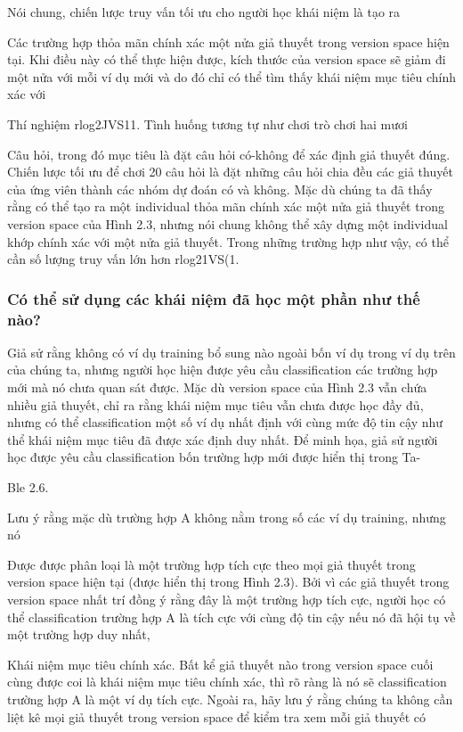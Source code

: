 Nói chung, chiến lược truy vấn tối ưu cho người học khái niệm là tạo ra

Các trường hợp thỏa mãn chính xác một nửa giả thuyết trong version space hiện tại. Khi điều này có thể thực hiện được, kích thước của version space sẽ giảm đi một nửa với mỗi ví dụ mới và do đó chỉ có thể tìm thấy khái niệm mục tiêu chính xác với

Thí nghiệm rlog2JVS11. Tình huống tương tự như chơi trò chơi hai mươi

Câu hỏi, trong đó mục tiêu là đặt câu hỏi có-không để xác định giả thuyết đúng. Chiến lược tối ưu để chơi 20 câu hỏi là đặt những câu hỏi chia đều các giả thuyết của ứng viên thành các nhóm dự đoán có và không. Mặc dù chúng ta đã thấy rằng có thể tạo ra một individual thỏa mãn chính xác một nửa giả thuyết trong version space của Hình 2.3, nhưng nói chung không thể xây dựng một individual khớp chính xác với một nửa giả thuyết. Trong những trường hợp như vậy, có thể cần số lượng truy vấn lớn hơn rlog21VS(1.

\subsubsection{Có thể sử dụng các khái niệm đã học một phần như thế nào?}

Giả sử rằng không có ví dụ training bổ sung nào ngoài bốn ví dụ trong ví dụ trên của chúng ta, nhưng người học hiện được yêu cầu classification các trường hợp mới mà nó chưa quan sát được. Mặc dù version space của Hình 2.3 vẫn chứa nhiều giả thuyết, chỉ ra rằng khái niệm mục tiêu vẫn chưa được học đầy đủ, nhưng có thể classification một số ví dụ nhất định với cùng mức độ tin cậy như thể khái niệm mục tiêu đã được xác định duy nhất. Để minh họa, giả sử người học được yêu cầu classification bốn trường hợp mới được hiển thị trong Ta-

Ble 2.6.

Lưu ý rằng mặc dù trường hợp A không nằm trong số các ví dụ training, nhưng nó

Được được phân loại là một trường hợp tích cực theo mọi giả thuyết trong version space hiện tại (được hiển thị trong Hình 2.3). Bởi vì các giả thuyết trong version space nhất trí đồng ý rằng đây là một trường hợp tích cực, người học có thể classification trường hợp A là tích cực với cùng độ tin cậy nếu nó đã hội tụ về một trường hợp duy nhất,

Khái niệm mục tiêu chính xác. Bất kể giả thuyết nào trong version space cuối cùng được coi là khái niệm mục tiêu chính xác, thì rõ ràng là nó sẽ classification trường hợp A là một ví dụ tích cực. Ngoài ra, hãy lưu ý rằng chúng ta không cần liệt kê mọi giả thuyết trong version space để kiểm tra xem mỗi giả thuyết có


